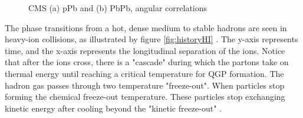 \begin{figure}%
    \centering
    \qquad
    \caption{CMS (a) pPb and (b) PbPb, angular correlations \cite{Chatrchyan:2013nka}}%
    \label{fig:exampleRidge}%
\end{figure}

The phase transitions from a hot, dense medium to stable hadrons are seen in heavy-ion collisions, as illustrated by figure \ref{fig:historyHI} \cite{Wang:2012jua}. The y-axis represents time, and the x-axis represents the longitudinal separation of the ions. Notice that after the ions cross, there is a "cascade" during which the partons take on thermal energy until reaching a critical temperature for QGP formation. The hadron gas passes through two temperature "freeze-out". When particles stop forming the chemical freeze-out temperature. These particles stop exchanging kinetic energy after cooling beyond the "kinetic freeze-out" \cite{bjEdense}.

